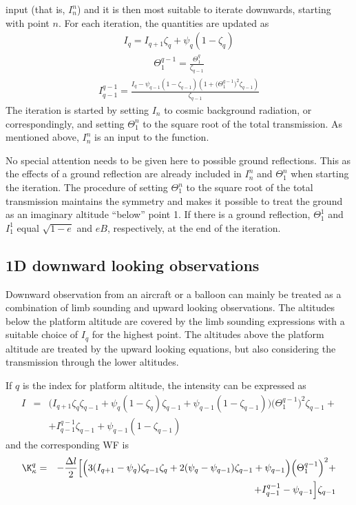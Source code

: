  input (that is, $I_n^n$) and it is then most suitable to iterate
 downwards, starting with point $n$. For each iteration, the
 quantities are updated as
 \begin{eqnarray}
   I_q = I_{q+1}\zeta_q + \psi_q(1-\zeta_q) \nonumber
 \end{eqnarray}
 \begin{eqnarray}
   \Theta_{1}^{q-1} =  \frac{\Theta_{1}^{q}}{\zeta_{q-1}} \nonumber
 \end{eqnarray}
 \begin{eqnarray}
   I_{q-1}^{q-1} = \frac{I_q - \psi_{q-1}(1-\zeta_{q-1})
       (1+\big(\Theta^{q-1}_{1}\big)^2\zeta_{q-1})}{\zeta_{q-1}} \nonumber
 \end{eqnarray}
 The iteration is started by setting $I_n$ to cosmic
 background radiation, or correspondingly, and setting
 $\Theta^n_1$ to the square root of the total transmission. As
 mentioned above, $I_n^n$ is an input to the function.
 
 No special attention needs to be given here to possible ground
 reflections.  This as the effects of a ground reflection are already
 included in $I_n^n$ and $\Theta^n_1$ when starting the iteration. The
 procedure of setting $\Theta^n_1$ to the square root of the total
 transmission maintains the symmetry and makes it possible to treat
 the ground as an imaginary altitude ``below'' point 1. If there is a
 ground reflection, $\Theta^1_1$ and $I_1^1$ equal $\sqrt{1-e}$ and
 $eB$, respectively, at the end of the iteration.


 

 \subsection{1D downward looking observations}
  \label{sec:wfuns:down}
  Downward observation from an aircraft or a balloon can mainly be
  treated as a combination of limb sounding and upward looking
  observations.  The altitudes below the platform altitude are covered
  by the limb sounding expressions with a suitable choice of $I_q$ for
  the highest point. The altitudes above the platform altitude are
  treated by the upward looking equations, but also considering the
  transmission through the lower altitudes. 
  
  If $q$ is the index for platform altitude, the intensity can be
  expressed as
  \begin{eqnarray}
   I &=& \Big(I_{q+1}\zeta_q\zeta_{q-1} +\psi_q(1-\zeta_q)\zeta_{q-1} + 
           \psi_{q-1}(1-\zeta_{q-1})\Big)\Big(\Theta^{q-1}_{1}\Big)^2
           \zeta_{q-1} + \nonumber \\
      & & + I_{q-1}^{q-1}\zeta_{q-1} + \psi_{q-1}(1-\zeta_{q-1})
    \label{eq:wfuns:idown}
  \end{eqnarray}
  and the corresponding WF is
  \begin{eqnarray}
   \K_{\kappa}^q& = & -\frac{\Delta l}{2}\Big[\Big(3(I_{q+1}-\psi_q)
           \zeta_{q-1}\zeta_q+ 2(\psi_q-\psi_{q-1})\zeta_{q-1} + \psi_{q-1} \Big)
           \Big(\Theta^{q-1}_{1}\Big)^2 + \nonumber \\
      & &  + I_{q-1}^{q-1}-\psi_{q-1}\Big]\zeta_{q-1}
  \end{eqnarray}



